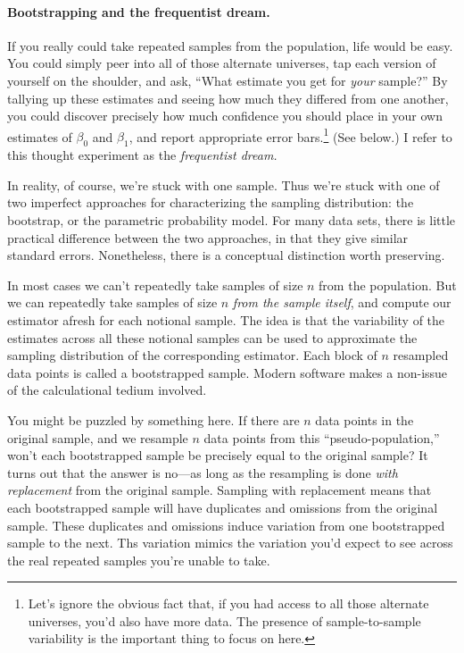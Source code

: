 \documentclass[11pt]{article}
\newcommand{\1}[1]{\mathbf{1}_{\{ {#1} \}}}
\begin{document}
\paragraph{Bootstrapping and the frequentist dream.}

If you really could take repeated samples from the population, life would be easy.  You could simply peer into all of those alternate universes, tap each version of yourself on the shoulder, and ask, ``What estimate you get for \textit{your} sample?''  By tallying up these estimates and seeing how much they differed from one another, you could discover precisely how much confidence you should place in your own estimates of $\beta_0$ and $\beta_1$, and report appropriate error bars.\footnote{Let's ignore the obvious fact that, if you had access to all those alternate universes, you'd also have more data.  The presence of sample-to-sample variability is the important thing to focus on here.}  (See below.)  I refer to this thought experiment as the \textit{frequentist dream.}

In reality, of course, we're stuck with one sample.  Thus we're stuck with one of two imperfect approaches for characterizing the sampling distribution: the bootstrap, or the parametric probability model.  For many data sets, there is little practical difference between the two approaches, in that they give similar standard errors.  Nonetheless, there is a conceptual distinction worth preserving.


In most cases we can't repeatedly take samples of size $n$ from the population.  But we can repeatedly take samples of size $n$ \textit{from the sample itself}, and compute our estimator afresh for each notional sample.  The idea is that the variability of the estimates across all these notional samples can be used to approximate the sampling distribution of the corresponding estimator.  Each block of $n$ resampled data points is called a bootstrapped sample.  Modern software makes a non-issue of the calculational tedium involved.

You might be puzzled by something here.  If there are $n$ data points in the original sample, and we resample $n$ data points from this ``pseudo-population,'' won't each bootstrapped sample be precisely equal to the original sample?  It turns out that the answer is no---as long as the resampling is done \textit{with replacement} from the original sample.  Sampling with replacement means that each bootstrapped sample will have duplicates and omissions from the original sample.  These duplicates and omissions induce variation from one bootstrapped sample to the next.  Ths variation mimics the variation you'd expect to see across the real repeated samples you're unable to take.
\end{document}
